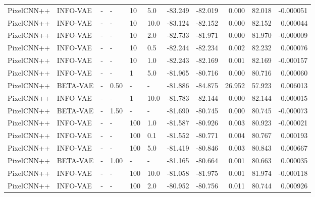 \begin{table}[!htb]
\begin{tabular}{llllll|rrrrr}
 PixelCNN++ &  INFO-VAE &         - &      - &    10 &  5.0 &      -83.249 &      -82.019 &       0.000 &      82.018 &  -0.000051 \\
 PixelCNN++ &  INFO-VAE &         - &      - &    10 & 10.0 &      -83.124 &      -82.152 &       0.000 &      82.152 &   0.000044 \\
 PixelCNN++ &  INFO-VAE &         - &      - &    10 &  2.0 &      -82.733 &      -81.971 &       0.000 &      81.970 &  -0.000009 \\
 PixelCNN++ &  INFO-VAE &         - &      - &    10 &  0.5 &      -82.244 &      -82.234 &       0.002 &      82.232 &   0.000076 \\
 PixelCNN++ &  INFO-VAE &         - &      - &    10 &  1.0 &      -82.243 &      -82.169 &       0.001 &      82.169 &  -0.000157 \\
 PixelCNN++ &  INFO-VAE &         - &      - &     1 &  5.0 &      -81.965 &      -80.716 &       0.000 &      80.716 &   0.000060 \\
 PixelCNN++ &  BETA-VAE &         - &  0.50 &     - &      - &      -81.886 &      -84.875 &      26.952 &      57.923 &   0.006013 \\
 PixelCNN++ &  INFO-VAE &         - &      - &     1 & 10.0 &      -81.783 &      -82.144 &       0.000 &      82.144 &  -0.000015 \\
 PixelCNN++ &  BETA-VAE &         - &  1.50 &     - &      - &      -81.690 &      -80.745 &       0.000 &      80.745 &  -0.000073 \\
 PixelCNN++ &  INFO-VAE &         - &      - &   100 &  1.0 &      -81.587 &      -80.926 &       0.003 &      80.923 &  -0.000021 \\
 PixelCNN++ &  INFO-VAE &         - &      - &   100 &  0.1 &      -81.552 &      -80.771 &       0.004 &      80.767 &   0.000193 \\
 PixelCNN++ &  INFO-VAE &         - &      - &   100 &  5.0 &      -81.419 &      -80.846 &       0.003 &      80.843 &   0.000667 \\
 PixelCNN++ &  BETA-VAE &         - &  1.00 &     - &      - &      -81.165 &      -80.664 &       0.001 &      80.663 &   0.000035 \\
 PixelCNN++ &  INFO-VAE &         - &      - &   100 & 10.0 &      -81.058 &      -81.975 &       0.001 &      81.974 &  -0.000118 \\
 PixelCNN++ &  INFO-VAE &         - &      - &   100 &  2.0 &      -80.952 &      -80.756 &       0.011 &      80.744 &   0.000926 \\

\end{tabular}
\end{table}
